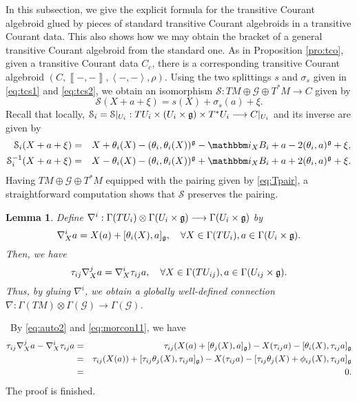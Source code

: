 \documentclass[letterpaper,10pt, oneside]{article} %
\newtheorem{lem}[thm]{Lemma}\newtheorem{lemma}[thm]{Lemma}
\newcommand {\emptycomment}[1]{}
\newcommand{\pf}{\noindent{\bf Proof.}\ }
\newcommand{\ii}{\mathbbm i}
\newcommand{\huaS}{\mathcal{S}}
\newcommand{\huaG}{\mathcal{G}}
\newcommand{\frkX}{\mathfrak X}
\def\qed{\hfill ~\vrule height6pt width6pt depth0pt}
\newcommand{\pair}[1]{\left\langle #1\right\rangle}
\newcommand{\Courant}[1]{\left\llbracket  #1\right\rrbracket }
\begin{document}
In this subsection, we give the explicit formula for the transitive Courant algebroid glued by pieces of standard transitive Courant algebroids in a transitive Courant data. This also shows how we may obtain the bracket of a general transitive Courant algebroid from the standard one. As in Proposition \ref{pro:tco}, given a transitive Courant data $C_c$,  there is a corresponding transitive Courant algebroid $(C, \Courant{-, -}, \pair{-,-}, \rho)$. Using the two splittings $s$ and $\sigma_s$ given in \eqref{eq:tcs1} and \eqref{eq:tcs2}, we obtain an isomorphism  $\huaS:TM\oplus \huaG\oplus T^*M\longrightarrow C$ given by
\begin{equation}\label{iso:tc}
\huaS(X+a+\xi)=s(X)+\sigma_s(a)+\xi.
\end{equation}
\emptycomment{Any section $e\in\Gamma(C)$ can be written as $e=s(X)+\sigma_s(a)+\xi$ for some $X\in\frkX(M),a\in\Gamma(\huaG)$ and $\xi\in\Omega^1(M)$.
Now we consider the induced pairing and bracket.} Recall that locally, $\huaS_i=\huaS|_{U_i}:TU_i\times(U_i\times\g)\times T^*U_i\longrightarrow C|_{U_i}$ and its inverse are given by
\begin{eqnarray*}
  \huaS_i(X+a+\xi)&=&X+\theta_i(X)-(\theta_i,\theta_i(X))^\g-\ii_XB_i+a-2(\theta_i,a)^\g+\xi,\\
   \huaS_i^{-1}(X+a+\xi)&=&X-\theta_i(X)-(\theta_i,\theta_i(X))^\g+\ii_XB_i+a+2(\theta_i,a)^\g+\xi.
\end{eqnarray*}
Having $TM\oplus \huaG\oplus T^*M$ equipped with the pairing given by \eqref{eq:Tpair}, a straightforward computation shows that $\huaS$ preserves the pairing.
\emptycomment{
\begin{lem}
Local isomorphisms $\huaS_i$'s preserve the pairing, that is,  $$\pair{\huaS_i(X+a+\xi),\huaS_i(Y+b+\eta)}^T=\pair{X+a+\xi,Y+b+\eta}^T.$$
Therefore,  $(C,\pair{-,-})$ is isomorphic to $(TM\oplus \huaG\oplus T^*M,\pair{-,-}^T)$.
\end{lem}}

\begin{lem}\label{lem:tcc}
Define $\nabla^i:\Gamma(TU_i)\otimes \Gamma(U_i\times \mathfrak g)\longrightarrow \Gamma(U_i\times \mathfrak g)$ by
\begin{equation}\label{eq:tcconnectionlocal}
 \nabla^i_Xa =X(a)+[\theta_i(X),a]_\mathfrak g, \quad \forall X\in\Gamma(TU_i), a\in\Gamma(U_i\times \mathfrak g).
\end{equation}
Then, we have
  $$
  \tau_{ij}\nabla^j_Xa=\nabla^i_X\tau_{ij}a,\quad \forall X\in\Gamma(TU_{ij}), a\in\Gamma(U_{ij}\times \mathfrak g).
  $$
  Thus, by gluing  $\nabla^i$, we obtain  a globally well-defined connection $\nabla:\Gamma(TM)\otimes \Gamma(\huaG)\longrightarrow \Gamma(\huaG)$.
\end{lem}
\pf By \eqref{eq:auto2} and \eqref{eq:morcon11}, we have
\begin{eqnarray*}
  \tau_{ij}\nabla^j_Xa-\nabla^i_X\tau_{ij}a&=&\tau_{ij}(X(a)+[\theta_j(X),a]_\mathfrak g)-X(\tau_{ij}a)-[\theta_i(X),\tau_{ij}a]_\mathfrak g\\
  &=&\tau_{ij}(X(a))+[\tau_{ij}\theta_j(X),\tau_{ij}a]_\mathfrak g)-X(\tau_{ij}a)-[\tau_{ij}\theta_j(X)+\phi_{ij}(X),\tau_{ij}a]_\mathfrak g\\
  &=&0.
\end{eqnarray*}
The proof is finished.  \qed\vspace{3mm}
\end{document}
